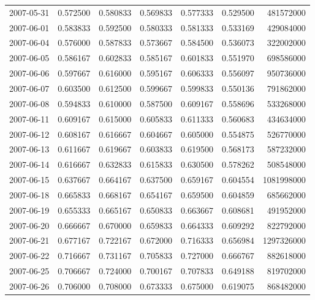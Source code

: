 \begin{tabular}{lrrrrrr}
2007-05-31 &    0.572500 &    0.580833 &    0.569833 &    0.577333 &    0.529500 &   481572000 \\
2007-06-01 &    0.583833 &    0.592500 &    0.580333 &    0.581333 &    0.533169 &   429084000 \\
2007-06-04 &    0.576000 &    0.587833 &    0.573667 &    0.584500 &    0.536073 &   322002000 \\
2007-06-05 &    0.586167 &    0.602833 &    0.585167 &    0.601833 &    0.551970 &   698586000 \\
2007-06-06 &    0.597667 &    0.616000 &    0.595167 &    0.606333 &    0.556097 &   950736000 \\
2007-06-07 &    0.603500 &    0.612500 &    0.599667 &    0.599833 &    0.550136 &   791862000 \\
2007-06-08 &    0.594833 &    0.610000 &    0.587500 &    0.609167 &    0.558696 &   533268000 \\
2007-06-11 &    0.609167 &    0.615000 &    0.605833 &    0.611333 &    0.560683 &   434634000 \\
2007-06-12 &    0.608167 &    0.616667 &    0.604667 &    0.605000 &    0.554875 &   526770000 \\
2007-06-13 &    0.611667 &    0.619667 &    0.603833 &    0.619500 &    0.568173 &   587232000 \\
2007-06-14 &    0.616667 &    0.632833 &    0.615833 &    0.630500 &    0.578262 &   508548000 \\
2007-06-15 &    0.637667 &    0.664167 &    0.637500 &    0.659167 &    0.604554 &  1081998000 \\
2007-06-18 &    0.665833 &    0.668167 &    0.654167 &    0.659500 &    0.604859 &   685662000 \\
2007-06-19 &    0.655333 &    0.665167 &    0.650833 &    0.663667 &    0.608681 &   491952000 \\
2007-06-20 &    0.666667 &    0.670000 &    0.659833 &    0.664333 &    0.609292 &   822792000 \\
2007-06-21 &    0.677167 &    0.722167 &    0.672000 &    0.716333 &    0.656984 &  1297326000 \\
2007-06-22 &    0.716667 &    0.731167 &    0.705833 &    0.727000 &    0.666767 &   882618000 \\
2007-06-25 &    0.706667 &    0.724000 &    0.700167 &    0.707833 &    0.649188 &   819702000 \\
2007-06-26 &    0.706000 &    0.708000 &    0.673333 &    0.675000 &    0.619075 &   868482000 \\

\end{tabular}
